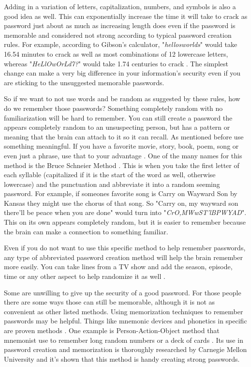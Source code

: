 \documentclass[acmsmall,nonacm]{acmart}
\begin{document}
Adding in a variation of letters, capitalization, numbers, and symbols is also a good idea as well. This can exponentially increase the time it will take to crack as password just about as much as increasing length does even if the password is memorable and considered not strong according to typical password creation rules\cite{lee_2014}. For example, according to Gibson’s calculator, "\emph{hellosworlds}" would take 16.54 minutes to crack as well as most combinations of 12 lowercase letters, whereas "\emph{HeLlOwOrLd7?}" would take 1.74 centuries to crack \cite{rubenking_2021}. The simplest change can make a very big difference in your information's security even if you are sticking to the unsuggested memorable passwords.

So if we want to not use words and be random as suggested by these rules, how do we remember those passwords? Something completely random with no familiarization will be hard to remember. You can still create a password the appears completely random to an unsuspecting person, but has a pattern or meaning that the brain can attach to it so it can recall. As mentioned before use something meaningful. If you have a favorite movie, story, book, poem, song or even just a phrase, use that to your advantage \cite{lee_2014,rubenking_2021}. One of the many names for this method is the Bruce Schneier Method \cite{lee_2014}. This is when you take the first letter of each syllable (capitalized if it is the start of the word as well, otherwise lowercase) and the punctuation and abbreviate it into a random seeming password. For example, if someones favorite song is Carry on Wayward Son by Kansas they might use the chorus of that song. So "Carry on, my wayward son there'll be peace when you are done" would turn into "\emph{CrO,MWwST'lBPWYAD}". This on its own appears completely random, but it is easier to remember because the brain can make a connection to something familiar. 

Even if you do not want to use this specific method to help remember passwords, any type of abbreviated password creation method will help the brain remember more easily. You can take lines from a TV show and add the season, episode, time or any other aspect to help randomize it as well \cite{rubenking_2021}. 

Some are unwilling to give up the security of a good password. For those people there are some ways those can still be memorable, although it is not as convenient as other listed methods. Using memorization techniques to remember passwords may be helpful. Things like mnemonic devices and phonetics in specific are proven methods \cite{rubenking_2021}. 
One example is Person-Action-Object method that mnemonist use to remember long random numbers or a deck of cards \cite{pao_wiki}. Its use in password creation and memorization is thoroughly researched by Carnegie Mellon University \cite{blocki_2013} and it's shown that this method is handy creating strong passwords.
\end{document}
